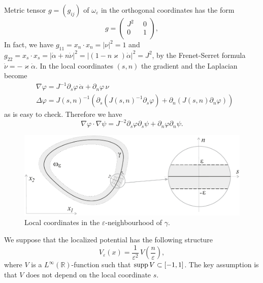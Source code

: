 \documentclass[graybox]{svmult}
\newcommand{\supp}{\mathop{\rm supp}}
\renewcommand{\kappa}{\varkappa}
\newcommand{\Real}{\mathbb R}
\newcommand{\eps}{\varepsilon}
\renewcommand{\phi}{\varphi}
\begin{document}
Metric tensor $g=(g_{ij})$ of $\omega_\eps$ in the orthogonal coordinates has the form
$$
    g=\left(
        \begin{array}{cc}
          J^2\phantom{0} & 0 \\
          0\phantom{0} & 1\\
        \end{array}
      \right),
$$
In fact, we have $g_{11}=x_n\cdot x_n=|\nu|^2=1$ and $g_{22}=x_s\cdot x_s=|\dot{\alpha}+n \dot{\nu}|^2
=|(1-n\kappa) \dot{\alpha}|^2=J^2$, by the Frenet-Serret formula $\dot{\nu}=-\kappa \dot{\alpha}$.
In the local coordinates $(s,n)$ the gradient and the Laplacian become
\begin{eqnarray}\nonumber
&\nabla \phi=J^{-1}\partial_s\phi\, \dot{\alpha}+\partial_n\phi\, \nu\\
\label{LaplacianInSN}
&\Delta \phi=J(s,n)^{-1}\left(\partial_s(J(s,n)^{-1}\partial_s \phi)+ \partial_n(J(s,n)\partial_n \phi)\right)
\end{eqnarray}
as is easy to check.  Therefore we have
\begin{equation}\label{ScalarProdGrads}
  \nabla \phi\cdot \nabla \psi=J^{-2}\partial_s\phi \partial_s \psi+
\partial_n \phi \partial_n \psi.
\end{equation}

\begin{figure}[h]
\centering
\includegraphics[scale=.6]{LocalCoords}
\caption{Local coordinates in the $\eps$-neighbourhood of $\gamma$.}
\label{FigLocalCoords}
\end{figure}


We suppose that the localized potential has the following structure
\begin{equation}\label{Veps}
V_\eps(x)=\frac{1}{\eps^2}\,V\left(\frac{n}{\eps}\right),
\end{equation}
where $V$ is a $L^\infty(\Real)$-function such that $\supp V\subset [-1,1]$. The key assumption is that $V$ does not depend on the local coordinate $s$.
\end{document}
